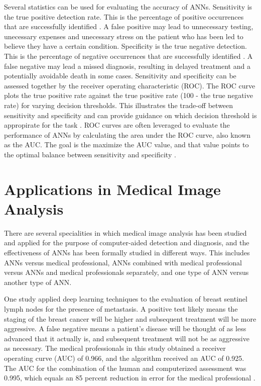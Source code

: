 \documentclass[sigconf]{acmart}
\begin{document}
Several statistics can be used for evaluating the accuracy of ANNs. Sensitivity is the true positive detection rate. This is the percentage of positive occurrences that are successfully identified \cite{cite11}. A false positive may lead to unnecessary testing, unecessary expenses and unecessary stress on the patient who has been led to believe they have a certain condition. Specificity is the true negative detection. This is the percentage of negative occurrences that are successfully identified \cite{cite11}. A false negative may lead a missed diagnosis, resulting in delayed treatment and a potentially avoidable death in some cases. Sensitivity and specificity can be assessed together by the receiver operating characteristic (ROC). The ROC curve plots the true positive rate against the true positive rate (100 - the true negative rate) for varying decision thresholds. This illustrates the trade-off between sensitivity and specificity and can provide guidance on which decision threshold is appropirate for the task \cite{cite11}. ROC curves are often leveraged to evaluate the performance of ANNs by calculating the area under the ROC curve, also known as the AUC. The goal is the maximize the AUC value, and that value points to the optimal balance between sensitivity and specificity \cite{cite11}.

\section{Applications in Medical Image Analysis}

There are several specialities in which medical image analysis has been studied and applied for the purpose of computer-aided detection and diagnosis, and the effectiveness of ANNs has been formally studied in different ways. This includes ANNs versus medical professional, ANNs combined with medical professional versus ANNs and medical professionals separately, and one type of ANN versus another type of ANN.

One study applied deep learning techniques to the evaluation of breast sentinel lymph nodes for the presence of metastasis. A positive test likely means the staging of the breast cancer will be higher and subsequent treatment will be more aggressive. A false negative means a patient's disease will be thought of as less advanced that it actually is, and subsequent treatment will not be as aggressive as necessary. The medical professionals in this study obtained a receiver operating curve (AUC) of 0.966, and the algorithm received an AUC of 0.925. The AUC for the combination of the human and computerized assessment was 0.995, which equals an 85 percent reduction in error for the medical professional \cite{cite09}.
\end{document}

